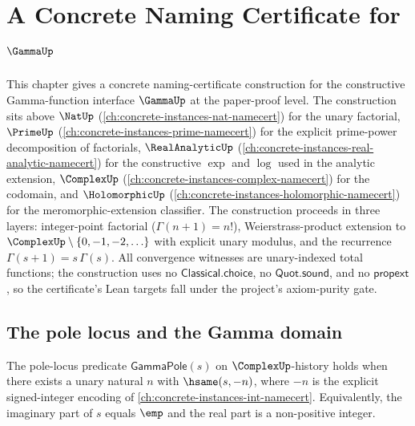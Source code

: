 \chapter{A Concrete Naming Certificate for \(\GammaUp\)}
\label{ch:concrete-instances-gamma-namecert}

This chapter gives a concrete naming-certificate construction for the constructive Gamma-function interface \(\GammaUp\) at the paper-proof level. The construction sits above \(\NatUp\) (\autoref{ch:concrete-instances-nat-namecert}) for the unary factorial, \(\PrimeUp\) (\autoref{ch:concrete-instances-prime-namecert}) for the explicit prime-power decomposition of factorials, \(\RealAnalyticUp\) (\autoref{ch:concrete-instances-real-analytic-namecert}) for the constructive \(\exp\) and \(\log\) used in the analytic extension, \(\ComplexUp\) (\autoref{ch:concrete-instances-complex-namecert}) for the codomain, and \(\HolomorphicUp\) (\autoref{ch:concrete-instances-holomorphic-namecert}) for the meromorphic-extension classifier. The construction proceeds in three layers: integer-point factorial (\(\Gamma(n+1) = n!\)), Weierstrass-product extension to \(\ComplexUp \setminus \{0, -1, -2, \ldots\}\) with explicit unary modulus, and the recurrence \(\Gamma(s+1) = s\,\Gamma(s)\). All convergence witnesses are unary-indexed total functions; the construction uses no \(\mathsf{Classical.choice}\), no \(\mathsf{Quot.sound}\), and no \(\mathsf{propext}\), so the certificate's Lean targets fall under the project's axiom-purity gate.

\section{The pole locus and the Gamma domain}
\label{sec:gamma-domain}

\begin{definition}
\label{def:gamma-pole-locus}
The pole-locus predicate \(\mathsf{GammaPole}(s)\) on \(\ComplexUp\)-history holds when there exists a unary natural \(n\) with \(\hsame(s, -n)\), where \(-n\) is the explicit signed-integer encoding of \autoref{ch:concrete-instances-int-namecert}. Equivalently, the imaginary part of \(s\) equals \(\emp\) and the real part is a non-positive integer.
\end{definition}

